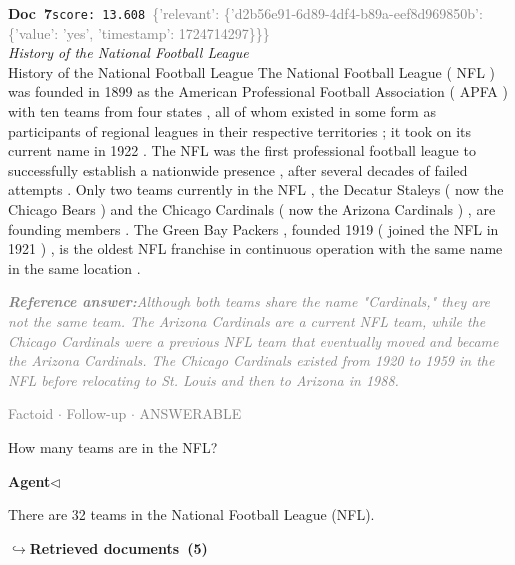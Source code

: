 \documentclass[a4paper,11pt]{article}
\begin{document}
\begin{docenv}
{\footnotesize\textcolor{doccolor}{\textbf{Doc~7}}}\hfill{\tiny\texttt{score:~13.608}}\ {\tiny\textcolor{gray}{\{'relevant': \{'d2b56e91-6d89-4df4-b89a-eef8d969850b': \{'value': 'yes', 'timestamp': 1724714297\}\}\}}}\\[3pt]
{\small\textit{History of the National Football League}}\\[2pt]
\vspace{2pt}
{\footnotesize History of the National Football League
The National Football League ( NFL ) was founded in 1899 as the American Professional Football Association ( APFA ) with ten teams from four states , all of whom existed in some form as participants of regional leagues in their respective territories ; it took on its current name in 1922 . The NFL was the first professional football league to successfully establish a nationwide presence , after several decades of failed attempts . Only two teams currently in the NFL , the Decatur Staleys ( now the Chicago Bears ) and the Chicago Cardinals ( now the Arizona Cardinals ) , are founding members . The Green Bay Packers , founded 1919 ( joined the NFL in 1921 ) , is the oldest NFL franchise in continuous operation with the same name in the same location .}
\end{docenv}
\begin{refanswerenv}
{\footnotesize\textit{\textcolor{gray}{\textbf{Reference answer:}\enspace Although both teams share the name "Cardinals," they are not the same team. The Arizona Cardinals are a current NFL team, while the Chicago Cardinals were a previous NFL team that eventually moved and became the Arizona Cardinals. The Chicago Cardinals existed from 1920 to 1959 in the NFL before relocating to St. Louis and then to Arizona in 1988.}}}
\end{refanswerenv}
\vspace{0.5em}
\hfill{\tiny\textcolor{gray}{Factoid $\cdot$ Follow-up $\cdot$ ANSWERABLE}}
\begin{userbubble}
How many teams are in the NFL?
\end{userbubble}
\noindent\hfill{\small\textcolor{agentcolor}{\textbf{Agent\enspace$\triangleleft$}}}
\begin{agentbubble}
There are 32 teams in the National Football League (NFL).
\end{agentbubble}
\noindent\hfill{\footnotesize\textcolor{doccolor}{\textbf{$\hookrightarrow$\enspace Retrieved documents~(5)}}}
\end{document}
